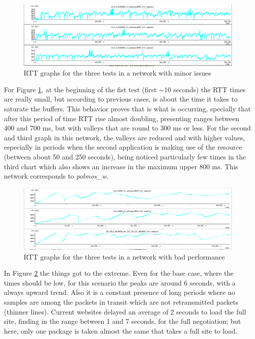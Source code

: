 \begin{figure}[ht]
\centering
    \includegraphics[width=\textwidth]{img/n_iperf_mid}
\caption[Iperf: RTT graphs for a network with minor issues]{RTT graphs for the three tests in a network with minor issues}
\label{fig:iperfmid}
\end{figure}%


For Figure \ref{fig:iperfmid}, at the beginning of the fist test (first $\sim10$ seconds) the RTT times are really small, but according to previous cases, is about the time it takes to saturate the buffers. This behavior proves that is what is occurring, specially that after this period of time RTT rise almost doubling, presenting ranges between 400 and 700 ms, but with valleys that are round to  300 ms or less. For the second and third graph in this network, the valleys are reduced and with higher values, especially in periods when the second application is making use of the resource (between about 50 and 250 seconds), being noticed particularly few times in the third chart which also shows an increase in the maximum upper 800 ms. This network corresponds to \emph{polmos\_w}.

\begin{figure}[ht]
\centering
    \includegraphics[width=\textwidth]{img/n_iperf_bad}
\caption[Iperf: RTT graphs for a network with bad performance]{RTT graphs for the three tests in a network with bad performance}
\label{fig:iperfbad}
\end{figure}%

In Figure \ref{fig:iperfbad} the things got to the extreme. Even for the base
case, where the times should be low, for this scenario the peaks are around 6
seconds, with a always upward trend. Also it is a constant presence of long
periods where no samples are among the packets in transit which are not
retransmitted packets (thinner lines). Current websites delayed an average of 2
seconds to load the full site, finding in the range between 1 and 7 seconds,
for the full negotiation; but here, only one package is taken almost the
same that takes a full site to load.

